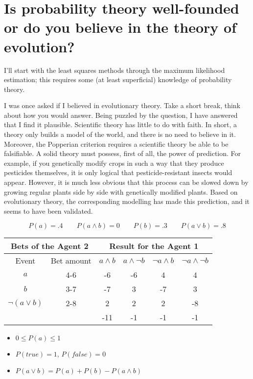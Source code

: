 \documentclass{article}
\begin{document}
\section{Is probability theory well-founded or do you believe in the theory of evolution?}

I’ll start with the least squares methods through the maximum likelihood estimation;
this requires some (at least superficial) knowledge of probability theory. 

I was once asked if I believed in evolutionary theory. 
Take a short break, think about how you would answer.
Being puzzled by the question, I have answered that I find it plausible. 
Scientific theory has little to do with faith.
In short, a theory only builds a model of the world, and there is no need to believe in it.
Moreover, the Popperian criterion\cite{} requires a scientific theory be able to be falsifiable. 
A solid theory must possess, first of all, the power of prediction.
For example, if you genetically modify crops in such a way that they produce pesticides themselves, 
it is only logical that pesticide-resistant insects would appear. 
However, it is much less obvious that this process can be slowed down by growing regular plants side by side with genetically modified plants. 
Based on evolutionary theory, the corresponding modelling has made this prediction\cite{}, and it seems to have been validated\cite{}.


$$P(a) = .4  \qquad  P(a\wedge b) = 0 \qquad P(b) = .3 \qquad P(a\vee b) = .8$$
	
\begin{tabular}{cccccc}
	\multicolumn{2}{c}{Bets of the Agent 2}  &  \multicolumn{4}{c}{Result for the Agent 1} \\
	\hline
	{\tiny Event} & {\tiny Bet amount} & {\tiny $a\wedge b$} & {\tiny $a\wedge \neg b$} &  {\tiny $\neg a\wedge b$} &  {\tiny $\neg a\wedge\neg b$} \\
	\hline
	$a$             & 4-6 & -6 & -6 &  4 &  4 \\
	$b$             & 3-7 & -7 &  3 & -7 &  3 \\
	$\neg(a\vee b)$ & 2-8 &  2 &  2 &  2 & -8 \\
	\hline
	&     &-11 & -1 & -1 & -1
\end{tabular}
	
\begin{itemize}
	\item $0\leq P(a)\leq 1$
	\item $P(true)=1$, $P(false) = 0$
	\item $P(a\vee b) = P(a) + P(b) - P(a\wedge b)$
\end{itemize}
\end{document}
